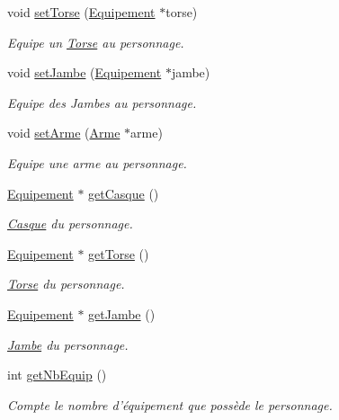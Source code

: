 \begin{DoxyCompactItemize}
void \hyperlink{class_personnage_aa4cb28bb5fcd125cdbc632a51fb87b7d}{set\-Torse} (\hyperlink{class_equipement}{Equipement} $\ast$torse)
\begin{DoxyCompactList}\small\item\em Equipe un \hyperlink{class_torse}{Torse} au personnage. \end{DoxyCompactList}\item 
void \hyperlink{class_personnage_ac63bee6c81c929308bf36d14253a43e2}{set\-Jambe} (\hyperlink{class_equipement}{Equipement} $\ast$jambe)
\begin{DoxyCompactList}\small\item\em Equipe des Jambes au personnage. \end{DoxyCompactList}\item 
void \hyperlink{class_personnage_ac24d31489cc986e870e60f257a9d0849}{set\-Arme} (\hyperlink{class_arme}{Arme} $\ast$arme)
\begin{DoxyCompactList}\small\item\em Equipe une arme au personnage. \end{DoxyCompactList}\item 
\hyperlink{class_equipement}{Equipement} $\ast$ \hyperlink{class_personnage_a6be6e0b23a90c362ddd6d8a3493193b8}{get\-Casque} ()
\begin{DoxyCompactList}\small\item\em \hyperlink{class_casque}{Casque} du personnage. \end{DoxyCompactList}\item 
\hyperlink{class_equipement}{Equipement} $\ast$ \hyperlink{class_personnage_a28565caaccdf1f8bc5fe76bf00b10311}{get\-Torse} ()
\begin{DoxyCompactList}\small\item\em \hyperlink{class_torse}{Torse} du personnage. \end{DoxyCompactList}\item 
\hyperlink{class_equipement}{Equipement} $\ast$ \hyperlink{class_personnage_af94423c768e960a49d04ad8514bf1b78}{get\-Jambe} ()
\begin{DoxyCompactList}\small\item\em \hyperlink{class_jambe}{Jambe} du personnage. \end{DoxyCompactList}\item 
int \hyperlink{class_personnage_af0c39d7e7d2c799962e9f75a62f2678d}{get\-Nb\-Equip} ()
\begin{DoxyCompactList}\small\item\em Compte le nombre d'équipement que possède le personnage. \end{DoxyCompactList}\item 

\end{DoxyCompactItemize}
